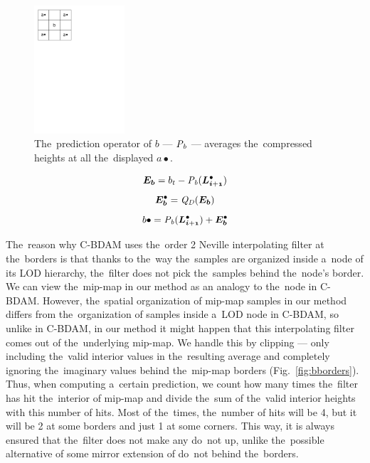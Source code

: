 \begin{figure}
	\includegraphics[trim={0 21cm 10cm 0}, clip, width=0.3\textwidth]{figures/bcomp.pdf}\centering
	\caption{The~prediction operator of $b$ --- $\mathit{P_{b}}$ --- averages the~compressed heights at all the~displayed $a\bullet$.}
	\label{fig:bcomp}
\end{figure}

$$\objnorm{E}{b} = b_t - \opnorm{P}{b}(\ldot{i+1})$$
$$\objdot{E}{b} = \opnorm{Q}{D}(\objnorm{E}{b})$$
\begin{equation}
\label{eq:b}
b\bullet = \opnorm{P}{b}(\ldot{i+1}) + \objdot{E}{b}
\end{equation}

The~reason why C-BDAM uses the~order 2 Neville interpolating filter at the~borders is that thanks to the~way the~samples are organized inside a~node of its LOD hierarchy, the~filter does not pick the~samples behind the~node's border. We can view the~mip-map in our method as an analogy to the~node in C-BDAM. However, the~spatial organization of mip-map samples in our method differs from the~organization of samples inside a~LOD node in C-BDAM, so unlike in C-BDAM, in our method it might happen that this interpolating filter comes out of the~underlying mip-map. We handle this by clipping --- only including the~valid interior values in the~resulting average and completely ignoring the~imaginary values behind the~mip-map borders (Fig.~\ref{fig:bborders}). Thus, when computing a~certain prediction, we count how many times the~filter has hit the~interior of mip-map and divide the~sum of the~valid interior heights with this number of hits. Most of the~times, the~number of hits will be 4, but it will be 2 at some borders and just 1 at some corners. This way, it is always ensured that the~filter does not make any do~not up, unlike the~possible alternative of some mirror extension of do~not behind the~borders.

